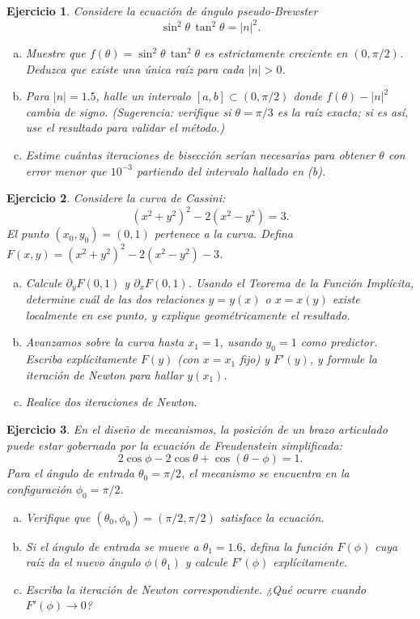 \documentclass[12pt]{article}
\newtheorem{exercise}{Ejercicio}
\newcommand{\bej}{\begin{exercise}\rm}
\newcommand{\fej}{\end{exercise}}
\begin{document}
\bej Considere la ecuación de ángulo pseudo-Brewster
\[
\sin^2\theta\,\tan^2\theta=|n|^2.
\]
\begin{enumerate}[(a)]
\item Muestre que $f(\theta)=\sin^2\theta\,\tan^2\theta$ es estrictamente creciente en $(0,\pi/2)$. Deduzca que existe una única raíz para cada $|n|>0$.
\item Para $|n|=1.5$, halle un intervalo $[a,b]\subset(0,\pi/2)$ donde $f(\theta)-|n|^2$ cambia de signo. (Sugerencia: verifique si $\theta=\pi/3$ es la raíz exacta; si es así, use el resultado para validar el método.)
\item Estime cuántas iteraciones de bisección serían necesarias para obtener $\theta$ con error menor que $10^{-3}$ partiendo del intervalo hallado en (b).
\end{enumerate}
\fej

\bej Considere la curva de Cassini:
\[
(x^2+y^2)^2-2(x^2-y^2)=3.
\]
El punto $(x_0,y_0)=(0,1)$ pertenece a la curva.
Defina $F(x,y)=(x^2+y^2)^2-2(x^2-y^2)-3$.
\begin{enumerate}[(a)]
\item Calcule $\partial_y F(0,1)$ y $\partial_x F(0,1)$.
Usando el Teorema de la Función Implícita, determine cuál de las dos relaciones $y=y(x)$ o $x=x(y)$ existe localmente en ese punto, y explique geométricamente el resultado.
\item Avanzamos sobre la curva hasta $x_1=1$, usando $y_0=1$ como predictor.
Escriba explícitamente $F(y)$ (con $x=x_1$ fijo) y $F'(y)$, y formule la iteración de Newton para hallar $y(x_1)$.
\item Realice dos iteraciones de Newton.
\end{enumerate}
\fej

\bej En el diseño de mecanismos, la posición de un brazo articulado puede estar gobernada por la ecuación de Freudenstein simplificada:
\[
2\cos\phi-2\cos\theta+\cos(\theta-\phi)=1.
\]
Para el ángulo de entrada $\theta_0=\pi/2$, el mecanismo se encuentra en la configuración $\phi_0=\pi/2$.
\begin{enumerate}[(a)]
\item Verifique que $(\theta_0,\phi_0)=(\pi/2,\pi/2)$ satisface la ecuación.
\item Si el ángulo de entrada se mueve a $\theta_1=1.6$, defina la función $F(\phi)$ cuya raíz da el nuevo ángulo $\phi(\theta_1)$ y calcule $F'(\phi)$ explícitamente.
\item Escriba la iteración de Newton correspondiente.
¿Qué ocurre cuando $F'(\phi)\to 0$?
\end{enumerate}
\fej
\end{document}
